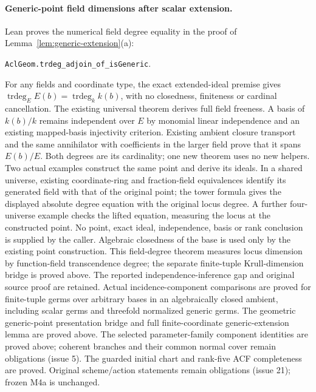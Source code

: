 \documentclass[11pt,oneside]{article}
\theoremstyle{definition}
\theoremstyle{remark}
\newcommand{\trdeg}{\operatorname{trdeg}}
\begin{document}
\paragraph{Generic-point field dimensions after scalar extension.}
Lean proves the numerical field degree equality in the proof of
Lemma~\ref{lem:generic-extension}(a):
\par\noindent
\texttt{AclGeom.trdeg\_adjoin\_of\_isGeneric}.
\par\noindent
For any fields and coordinate type, the exact extended-ideal premise
gives $\trdeg_E E(b)=\trdeg_k k(b)$, with no closedness, finiteness or
cardinal cancellation. The existing universal theorem derives full
field freeness. A basis of $k(b)/k$ remains independent over $E$ by
monomial linear independence and an existing mapped-basis injectivity
criterion. Existing ambient closure transport and the same annihilator
with coefficients in the larger field prove that it spans $E(b)/E$.
Both degrees are its cardinality; one new theorem uses no new helpers.
Two actual examples construct the same point and derive its ideals.
In a shared universe, existing coordinate-ring and fraction-field
equivalences identify its generated field with that of the original
point; the tower formula gives the displayed absolute degree equation
with the original locus degree. A further four-universe example checks
the lifted equation, measuring the locus at the constructed point.
No point, exact ideal, independence, basis or rank conclusion is supplied
by the caller. Algebraic closedness of the base is used only by the
existing point construction. This field-degree theorem measures locus dimension by function-field
transcendence degree; the separate finite-tuple Krull-dimension bridge is
proved above. The reported independence-inference gap and original source
proof are retained. Actual incidence-component comparisons are proved for
finite-tuple germs over arbitrary bases in an algebraically closed ambient,
including scalar germs and threefold normalized generic germs. The geometric
generic-point presentation bridge and full finite-coordinate generic-extension
lemma are proved above. The selected parameter-family component identities
are proved above; coherent branches and their common normal cover remain
obligations (issue 5).
The guarded initial chart and rank-five ACF completeness are proved. Original scheme/action
statements remain obligations (issue 21); frozen M4a is unchanged.

\clearpage
\end{document}

